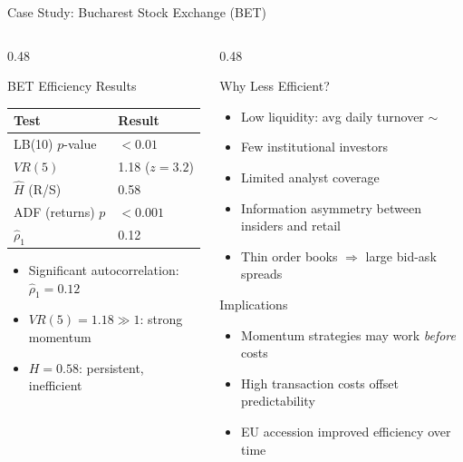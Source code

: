\documentclass[9pt, aspectratio=169, t]{beamer}
\theoremstyle{definition}
\newenvironment{cminipage}[1]{%
    \par\noindent\hfill\begin{minipage}{#1}\ignorespaces
}{%
    \end{minipage}\hfill\null\par
}
\begin{document}
\begin{frame}{Case Study: Bucharest Stock Exchange (BET)}
\begin{cminipage}{0.95\textwidth}
\small
\begin{columns}[T]
\begin{column}{0.48\textwidth}
\begin{block}{BET Efficiency Results}
\footnotesize
\renewcommand{\arraystretch}{1.1}
\begin{tabular}{ll}
\toprule
\textbf{Test} & \textbf{Result} \\
\midrule
LB(10) $p$-value & $<0.01$ \\
$VR(5)$ & 1.18 ($z = 3.2$) \\
$\hat{H}$ (R/S) & 0.58 \\
ADF (returns) $p$ & $<0.001$ \\
$\hat{\rho}_1$ & 0.12 \\
\bottomrule
\end{tabular}
\end{block}
\begin{itemize}\setlength{\itemsep}{0pt}
    \item Significant autocorrelation: $\hat{\rho}_1 = 0.12$
    \item $VR(5) = 1.18 \gg 1$: strong momentum
    \item $H = 0.58$: persistent, inefficient
\end{itemize}
\end{column}
\begin{column}{0.48\textwidth}
\begin{alertblock}{Why Less Efficient?}
\begin{itemize}\setlength{\itemsep}{0pt}
    \item Low liquidity: avg daily turnover $\sim$
    \item Few institutional investors
    \item Limited analyst coverage
    \item Information asymmetry between insiders and retail
    \item Thin order books $\Rightarrow$ large bid-ask spreads
\end{itemize}
\end{alertblock}
\begin{exampleblock}{Implications}
\begin{itemize}\setlength{\itemsep}{0pt}
    \item Momentum strategies may work \textit{before} costs
    \item High transaction costs offset predictability
    \item EU accession improved efficiency over time
\end{itemize}
\end{exampleblock}
\end{column}
\end{columns}
\end{cminipage}
\end{frame}
\end{document}
